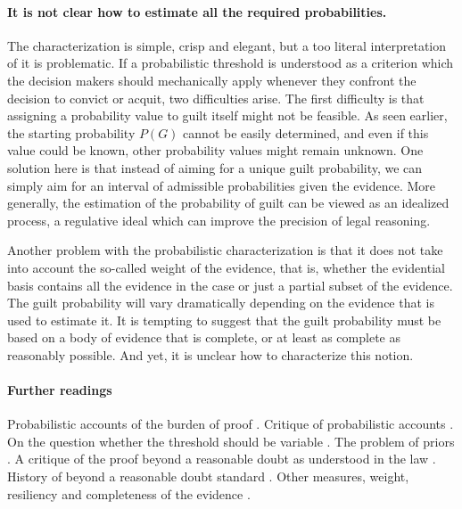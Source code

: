 \documentclass[10pt]{article}
\begin{document}

\paragraph{It is not clear how to estimate all the required probabilities.}

The characterization is simple, crisp and elegant, but a too literal interpretation of it is problematic.  If a probabilistic threshold is understood as a criterion which the decision makers 
 should mechanically apply whenever they confront the decision to convict or acquit, two difficulties arise. The first difficulty is that assigning a probability value to guilt itself might not be feasible. As seen earlier, the starting probability $P(G)$ cannot be easily determined, 
and even if this value could be known, other probability values might remain unknown. One solution here is that instead 
 of aiming for a unique guilt probability, we can simply aim for an interval of admissible probabilities given the evidence. 
 More generally, the estimation of the probability of guilt can be viewed as an idealized process, a regulative ideal which can improve the precision of legal reasoning. 

Another problem with the probabilistic characterization 
is that it does not take into account the so-called weight of the evidence, that is, whether the evidential basis contains all the evidence 
in the case or just a partial subset of the evidence. The guilt probability will vary dramatically 
depending on the evidence that is used to estimate it. It is tempting to suggest that the guilt probability must be based on a body 
of evidence that is complete, or at least as complete as reasonably possible. And yet, it is unclear how to characterize this notion.

\paragraph{Further readings}

Probabilistic accounts of the burden of proof
\citep{kaplan1968, kaye1986, kaye1999, hamer2004, cheng2013}.
Critique of probabilistic accounts \citep{cohen1977, nesson79, thomson86, stein05, ho08, pardoAllen2008, haack2014}.
On the question whether the threshold should be variable \citep{kaplow2012, picinali2013}.
The problem of priors \citep{finkelsteinFairley1970, friedman2000}.
A critique of the proof beyond a reasonable doubt  
as understood in the law \citep{laudan2006}.
History of beyond a reasonable doubt standard 
\citep{shapiro1991, whitman2008}. Other measures, weight, resiliency and completeness 
of the evidence \citep{kaye1999, stein05}.
\end{document}
